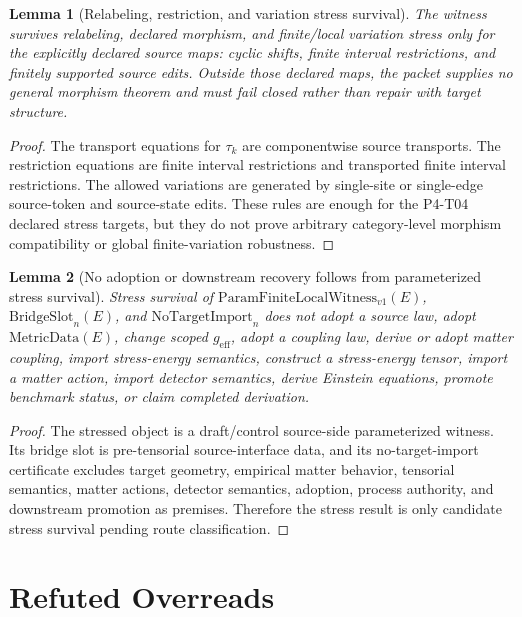 \documentclass[11pt]{article}
\newcommand{\MetricData}{\mathrm{MetricData}}
\newcommand{\geff}{g_{\mathrm{eff}}}
\newcommand{\PFLFW}{\mathrm{ParamFiniteLocalWitness}_{v1}}
\newcommand{\BridgeSlot}{\mathrm{BridgeSlot}}
\newcommand{\NoTargetImport}{\mathrm{NoTargetImport}}
\newtheorem{lemma}{Lemma}
\begin{document}
\begin{lemma}[Relabeling, restriction, and variation stress survival]
The witness survives relabeling, declared morphism, and finite/local variation
stress only for the explicitly declared source maps: cyclic shifts, finite
interval restrictions, and finitely supported source edits. Outside those
declared maps, the packet supplies no general morphism theorem and must fail
closed rather than repair with target structure.
\end{lemma}

\begin{proof}
The transport equations for \(\tau_k\) are componentwise source transports.
The restriction equations are finite interval restrictions and transported
finite interval restrictions. The allowed variations are generated by
single-site or single-edge source-token and source-state edits. These rules
are enough for the P4-T04 declared stress targets, but they do not prove
arbitrary category-level morphism compatibility or global finite-variation
robustness.
\end{proof}

\begin{lemma}[No adoption or downstream recovery follows from parameterized stress survival]
Stress survival of \(\PFLFW(E)\), \(\BridgeSlot_n(E)\), and
\(\NoTargetImport_n\) does not adopt a source law, adopt \(\MetricData(E)\),
change scoped \(\geff\), adopt a coupling law, derive or adopt matter
coupling, import stress-energy semantics, construct a stress-energy tensor,
import a matter action, import detector semantics, derive Einstein equations,
promote benchmark status, or claim completed derivation.
\end{lemma}

\begin{proof}
The stressed object is a draft/control source-side parameterized witness. Its
bridge slot is pre-tensorial source-interface data, and its no-target-import
certificate excludes target geometry, empirical matter behavior, tensorial
semantics, matter actions, detector semantics, adoption, process authority,
and downstream promotion as premises. Therefore the stress result is only
candidate stress survival pending route classification.
\end{proof}

\section{Refuted Overreads}
\end{document}
